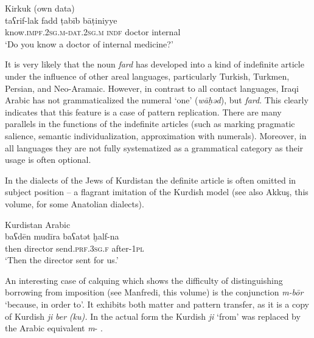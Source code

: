\documentclass[output=paper]{langsci/langscibook}
\begin{document}
\ea\label{fadd} 
{Kirkuk (own data)}\\
\gll taʕrif-lak fadd ṭabīb bāṭiniyye\\
     know.\textsc{impf.2sg.m-dat.2sg.m} \textsc{indf} doctor internal \\
\glt ‘Do you know a doctor of internal medicine?'
\z

It is very likely that the noun \textit{fard} has developed into a kind of indefinite article under the influence of other areal languages, particularly Turkish, Turkmen, Persian, and Neo-Aramaic. However, in contrast to all contact languages, Iraqi Arabic has not grammaticalized the numeral ‘one’ (\textit{wāḥəd}), but \textit{fard}. This clearly indicates that this feature is a case of pattern replication. There are many parallels in the functions of the indefinite articles (such as marking pragmatic salience, semantic individualization, approximation with numerals). Moreover, in all languages they are not fully systematized as a grammatical category as their usage is often optional. 

In the dialects of the Jews of Kurdistan the definite article is often omitted in subject position – a flagrant imitation of the Kurdish model (see also Akkuş, this volume, for some Anatolian dialects).

\ea\label{ex:prochazka:} 
{Kurdistan Arabic \citep[71]{Jastrow1990}} \\
\gll baʕdēn mudīra baʕatət ḫalf-na\\
     then director send.\textsc{prf.3sg.f} after-\textsc{1pl}\\
\glt ‘Then the director sent for us.’
\z

An interesting case of calquing which shows the difficulty of distinguishing borrowing from imposition (see Manfredi, this volume) is the conjunction \textit{m-bōr} ‘because, in order to’. It exhibits both matter and pattern transfer, as it is a copy of Kurdish \textit{ji} \textit{ber} \textit{(ku).} In the actual form the Kurdish \textit{ji} ‘from’ was replaced by the Arabic equivalent \textit{m}{}- \citep[64]{Jastrow1979}. 
\end{document}
